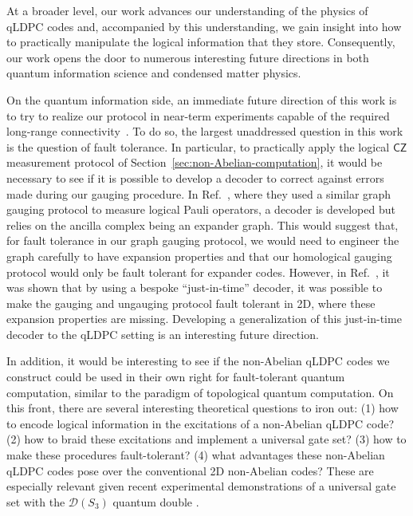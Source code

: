 \documentclass[aps,prx,reprint,superscriptaddress,nofootinbib]{revtex4-2}
\theoremstyle{definition}
\newcommand{\<}{\langle}
\renewcommand{\>}{\rangle}
\begin{document}
At a broader level, our work advances our understanding of the physics of qLDPC codes and, accompanied by this understanding, we gain insight into how to practically manipulate the logical information that they store.
%
Consequently, our work opens the door to numerous interesting future directions in both quantum information science and condensed matter physics.

On the quantum information side, an immediate future direction of this work is to try to realize our protocol in near-term experiments capable of the required long-range connectivity~\cite{Periwal_2021, bluvstein_logical_2024,chiu_continuous_2025,sinclair_fault-tolerant_2025,bluvstein_fault-tolerant_2026,moses_race-track_2023,ransford_helios_2025}.
%
To do so,  the largest unaddressed question in this work is the question of fault tolerance.
%
In particular, to practically apply the logical $\mathsf{CZ}$ measurement protocol of Section~\ref{sec:non-Abelian-computation}, it would be necessary to see if it is possible to develop a decoder to correct against errors made during our gauging procedure.
%
In Ref.~\cite{williamson_tanner}, where they used a similar graph gauging protocol to measure logical Pauli operators, a decoder is developed but relies on the ancilla complex being an expander graph.
%
This would suggest that, for fault tolerance in our graph gauging protocol, we would need to engineer the graph carefully to have expansion properties and that our homological gauging protocol would only be fault tolerant for expander codes.
%
However, in Ref.~\cite{margaritaknots}, it was shown that by using a bespoke ``just-in-time'' decoder, it was possible to make the gauging and ungauging protocol fault tolerant in 2D, where these expansion properties are missing.
%
Developing a generalization of this just-in-time decoder to the qLDPC setting is an interesting future direction.

In addition, it would be interesting to see if the non-Abelian qLDPC codes we construct could be used in their own right for fault-tolerant quantum computation, similar to the paradigm of topological quantum computation.
%
On this front, there are several interesting theoretical questions to iron out:
%
(1) how to encode logical information in the excitations of a non-Abelian qLDPC code? (2) how to braid these excitations and implement a universal gate set? (3) how to make these procedures fault-tolerant? (4) what advantages these non-Abelian qLDPC codes pose over the conventional 2D non-Abelian codes?
%
These are especially relevant given recent experimental demonstrations of a universal gate set with the $\mathcal{D}(S_3)$ quantum double \cite{lo2026universaltopologicalgatesbraiding}.%
\end{document}
